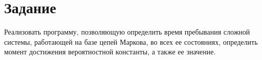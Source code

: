 \chapter{Задание}

Реализовать программу, позволяющую определить время пребывания сложной системы, работающей на базе цепей Маркова, во всех ее состояниях, определить момент достижения вероятностной константы, а также ее значение.
